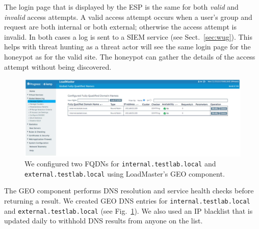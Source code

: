 The login page that is displayed by the ESP is the same for both
\textit{valid} and \textit{invalid} access attempts.  A valid access
attempt occurs when a user's group and request are both internal or
both external; otherwise the access attempt is invalid.  In both cases
a log is sent to a SIEM service (see Sect.~\ref{sec:wug}).  This helps
with threat hunting as a threat actor will see the same login page for
the honeypot as for the valid site.  The honeypot can gather the
details of the access attempt without being discovered.

\begin{figure}
  \centerline{\includegraphics[width=\textwidth]{img/loadmaster-geo}}
  \caption{We configured two FQDNs for \texttt{internal.testlab.local}
    and \texttt{external.testlab.local} using LoadMaster's GEO
    component.}\label{fig:loadmaster-geo}
\end{figure}

The GEO component performs DNS resolution and service health checks
before returning a result.  We created GEO DNS entries for
\texttt{internal.testlab.local} and \texttt{external.testlab.local}
(see Fig.~\ref{fig:loadmaster-geo}).  We also used an IP blacklist
that is updated daily to withhold DNS results from anyone on the list.

